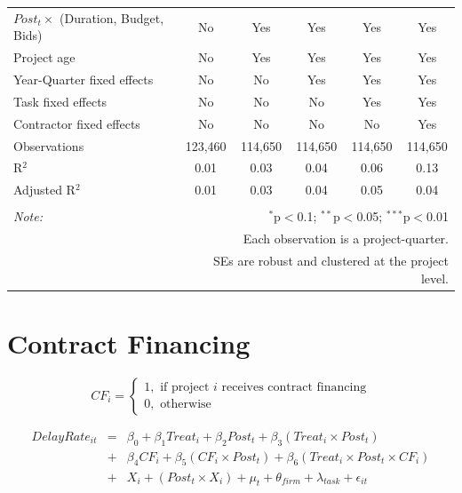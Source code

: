 \documentclass[
]{article}
\begin{document}
\begin{table}[H]
\begin{tabular}{@{\extracolsep{-2pt}}lccccc}
$Post_t \times$  (Duration, Budget, Bids) & No & Yes & Yes & Yes & Yes \\ 
Project age & No & Yes & Yes & Yes & Yes \\ 
Year-Quarter fixed effects & No & No & Yes & Yes & Yes \\ 
Task fixed effects & No & No & No & Yes & Yes \\ 
Contractor fixed effects & No & No & No & No & Yes \\ 
Observations & 123,460 & 114,650 & 114,650 & 114,650 & 114,650 \\ 
R$^{2}$ & 0.01 & 0.03 & 0.04 & 0.06 & 0.13 \\ 
Adjusted R$^{2}$ & 0.01 & 0.03 & 0.04 & 0.05 & 0.04 \\ 
\hline 
\hline \\[-1.8ex] 
\textit{Note:}  & \multicolumn{5}{r}{$^{*}$p$<$0.1; $^{**}$p$<$0.05; $^{***}$p$<$0.01} \\ 
 & \multicolumn{5}{r}{Each observation is a project-quarter.} \\ 
 & \multicolumn{5}{r}{SEs are robust and clustered at the project level.} \\ 
\end{tabular} 
\end{table}

\hypertarget{contract-financing}{%
\section{Contract Financing}\label{contract-financing}}

\[ CF_i = \begin{cases} 1, \text{ if project } i \text{ receives contract financing}\\
0, \text{ otherwise} \end{cases}\]

\[ \begin{aligned}
DelayRate_{it} &=& \beta_0+\beta_1 Treat_i + \beta_2 Post_t + \beta_3 (Treat_i \times Post_t) \\
&+&\beta_4 CF_i + \beta_5 (CF_i \times Post_t) + \beta_6 (Treat_i \times Post_t \times CF_i) \\ 
&+&X_i + (Post_t \times X_i) + \mu_t + \theta_{firm} + \lambda_{task}+ \epsilon_{it}
\end{aligned}\]
\end{document}
